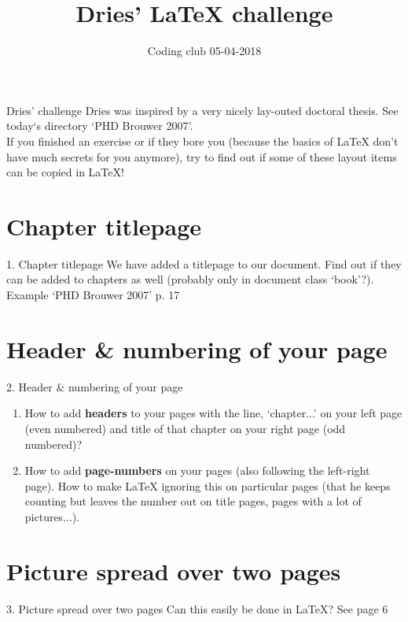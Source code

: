 \documentclass{beamer}
\title{Dries' \LaTeX{} challenge}
\subtitle{Coding club 05-04-2018}
\date{}
\begin{document}
\begin{frame}
\titlepage
\end{frame}

\begin{frame}{Dries' challenge}
Dries was inspired by a very nicely lay-outed doctoral thesis. See today`s directory `PHD Brouwer 2007'.\\
If you finished an exercise or if they bore you (because the basics of \LaTeX{} don't have much secrets for you anymore), try to find out if some of these layout items can be copied in \LaTeX{}! 
\end{frame}

\begin{frame}
\tableofcontents
\end{frame}

\section{Chapter titlepage}
\begin{frame}{1. Chapter titlepage}
We have added a titlepage to our document. Find out if they can be added to chapters as well (probably only in document class `book'?).\\
Example `PHD Brouwer 2007' p. 17
\end{frame}

\section{Header \& numbering of your page}
\begin{frame}{2. Header \& numbering of your page}
\begin{enumerate}
\item How to add \textbf{headers} to your pages with the line, `chapter...' on your left page (even numbered) and title of that chapter on your right page (odd numbered)?
\item How to add \textbf{page-numbers} on your pages (also following the left-right page). How to make \LaTeX{} ignoring this on particular pages (that he keeps counting but leaves the number out on title pages, pages with a lot of pictures...).
\end{enumerate}
\end{frame}

\section{Picture spread over two pages}
\begin{frame}{3. Picture spread over two pages}
Can this easily be done in \LaTeX{}? See page 6
\end{frame}
\end{document}
